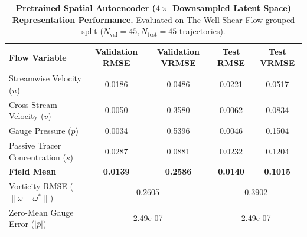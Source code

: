 \begin{table}[t]
\centering
\small
\caption{\textbf{Pretrained Spatial Autoencoder ($4 \times$ Downsampled Latent Space) Representation Performance.} Evaluated on The Well Shear Flow grouped split ($N_{\mathrm{val}}=45, N_{\mathrm{test}}=45$ trajectories).}
\label{tab:representation_performance}
\begin{tabular}{lcccc}
\toprule
\textbf{Flow Variable} & \textbf{Validation RMSE} & \textbf{Validation VRMSE} & \textbf{Test RMSE} & \textbf{Test VRMSE} \\
\midrule
Streamwise Velocity ($u$) & 0.0186 & 0.0486 & 0.0221 & 0.0517 \\
Cross-Stream Velocity ($v$) & 0.0050 & 0.3580 & 0.0062 & 0.0834 \\
Gauge Pressure ($p$) & 0.0034 & 0.5396 & 0.0046 & 0.1504 \\
Passive Tracer Concentration ($s$) & 0.0287 & 0.0881 & 0.0232 & 0.1204 \\
\midrule
\textbf{Field Mean} & \textbf{0.0139} & \textbf{0.2586} & \textbf{0.0140} & \textbf{0.1015} \\
Vorticity RMSE ($\|\omega - \omega^*\|$) & \multicolumn{2}{c}{0.2605} & \multicolumn{2}{c}{0.3902} \\
Zero-Mean Gauge Error ($|\bar{p}|$) & \multicolumn{2}{c}{2.49e-07} & \multicolumn{2}{c}{2.49e-07} \\
\bottomrule
\end{tabular}
\end{table}
